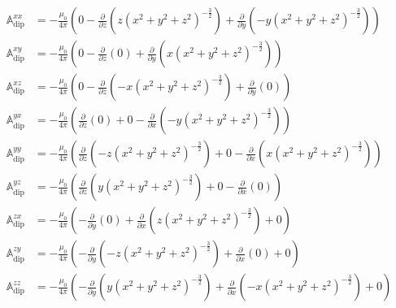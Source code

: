 \documentclass[12pt]{article}
\begin{document}
\begin{align}
\mathbb{A}_\mathrm{dip}^{xx} &= -\frac{\mu_0}{4\pi}\left( 0 - \frac{\partial}{\partial z}\left( z\left( x^2 + y^2 + z^2 \right)^{-\frac{3}{2}} \right) + \frac{\partial}{\partial y}\left( -y\left( x^2 + y^2 + z^2 \right)^{-\frac{3}{2}} \right) \right) \\
\mathbb{A}_\mathrm{dip}^{xy} &= -\frac{\mu_0}{4\pi}\left( 0 - \frac{\partial}{\partial z}\left( 0 \right) + \frac{\partial}{\partial y}\left( x\left( x^2 + y^2 + z^2 \right)^{-\frac{3}{2}} \right) \right) \\
\mathbb{A}_\mathrm{dip}^{xz} &= -\frac{\mu_0}{4\pi}\left( 0 - \frac{\partial}{\partial z}\left( -x\left( x^2 + y^2 + z^2 \right)^{-\frac{3}{2}} \right) + \frac{\partial}{\partial y}\left( 0 \right) \right) \\
\mathbb{A}_\mathrm{dip}^{yx} &= -\frac{\mu_0}{4\pi}\left( \frac{\partial}{\partial z}\left( 0 \right) +  0 - \frac{\partial}{\partial x}\left( -y\left( x^2 + y^2 + z^2 \right)^{-\frac{3}{2}} \right) \right) \\
\mathbb{A}_\mathrm{dip}^{yy} &= -\frac{\mu_0}{4\pi}\left( \frac{\partial}{\partial z}\left( -z\left( x^2 + y^2 + z^2 \right)^{-\frac{3}{2}} \right) +  0 - \frac{\partial}{\partial x}\left( x\left( x^2 + y^2 + z^2 \right)^{-\frac{3}{2}} \right) \right) \\
\mathbb{A}_\mathrm{dip}^{yz} &= -\frac{\mu_0}{4\pi}\left( \frac{\partial}{\partial z}\left( y\left( x^2 + y^2 + z^2 \right)^{-\frac{3}{2}} \right) +  0 - \frac{\partial}{\partial x}\left( 0 \right) \right) \\
\mathbb{A}_\mathrm{dip}^{zx} &= -\frac{\mu_0}{4\pi}\left( -\frac{\partial}{\partial y}\left( 0 \right) + \frac{\partial}{\partial x}\left( z\left( x^2 + y^2 + z^2 \right)^{-\frac{3}{2}} \right) + 0 \right) \\
\mathbb{A}_\mathrm{dip}^{zy} &= -\frac{\mu_0}{4\pi}\left( -\frac{\partial}{\partial y}\left( -z\left( x^2 + y^2 + z^2 \right)^{-\frac{3}{2}} \right) + \frac{\partial}{\partial x}\left( 0 \right) + 0 \right) \\
\mathbb{A}_\mathrm{dip}^{zz} &= -\frac{\mu_0}{4\pi}\left( -\frac{\partial}{\partial y}\left( y\left( x^2 + y^2 + z^2 \right)^{-\frac{3}{2}} \right) + \frac{\partial}{\partial x}\left( -x\left( x^2 + y^2 + z^2 \right)^{-\frac{3}{2}} \right) + 0 \right)
\end{align}
\end{document}
